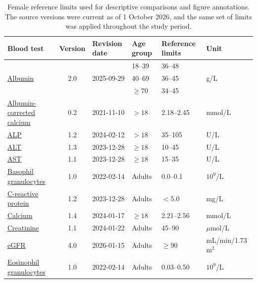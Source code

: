 \begin{table}[H]
\centering
\small
\caption{Female reference limits used for descriptive comparisons and figure annotations. The source versions were current as of 1 October 2026, and the same set of limits was applied throughout the study period.}
\label{tab:laboratory_reference_limits}
\setlength{\tabcolsep}{5pt}
\renewcommand{\arraystretch}{1.1}
\begin{tabular}{@{}lcllll@{}}
\toprule
Blood test & Version & Revision date & Age group & Reference limits & Unit \\
\midrule
\multirow{3}{*}{\href{https://metodebok.no/emne/K88XLHC4}{Albumin}} & \multirow{3}{*}{2.0} & \multirow{3}{*}{2025-09-29} & 18--39 & 36--48 & \multirow{3}{*}{g/L} \\
 &  &  & 40--69 & 36--45 &  \\
 &  &  & $\geq 70$ & 34--45 &  \\
\midrule[0.25pt]
\href{https://metodebok.no/emne/2s8iNNpi}{Albumin-corrected calcium} & 0.2 & 2021-11-10 & $>18$ & 2.18--2.45 & mmol/L \\
\midrule[0.25pt]
\href{https://metodebok.no/emne/bxfRyFeu}{ALP} & 1.2 & 2024-02-12 & $>18$ & 35--105 & U/L \\
\midrule[0.25pt]
\href{https://metodebok.no/emne/kDdUAjT6}{ALT} & 1.3 & 2023-12-28 & $\geq 18$ & 10--45 & U/L \\
\midrule[0.25pt]
\href{https://metodebok.no/emne/EbWvbBiZ}{AST} & 1.1 & 2023-12-28 & $\geq 18$ & 15--35 & U/L \\
\midrule[0.25pt]
\href{https://metodebok.no/emne/qtFMX6KQ}{Basophil granulocytes} & 1.0 & 2022-02-14 & Adults & 0.0--0.1 & $10^9$/L \\
\midrule[0.25pt]
\href{https://metodebok.no/emne/AAAGNvG6}{C-reactive protein} & 1.2 & 2023-12-28 & Adults & $<5.0$ & mg/L \\
\midrule[0.25pt]
\href{https://metodebok.no/emne/2BJXwvsK}{Calcium} & 1.4 & 2024-01-17 & $\geq 18$ & 2.21--2.56 & mmol/L \\
\midrule[0.25pt]
\href{https://metodebok.no/emne/C3K2MXe8}{Creatinine} & 1.1 & 2024-01-22 & Adults & 45--90 & $\mu$mol/L \\
\midrule[0.25pt]
\href{https://metodebok.no/emne/szcrcA8C}{eGFR} & 4.0 & 2026-01-15 & Adults & $\geq 90$ & mL/min/1.73\,m$^2$ \\
\midrule[0.25pt]
\href{https://metodebok.no/emne/qtFMX6KQ}{Eosinophil granulocytes} & 1.0 & 2022-02-14 & Adults & 0.03--0.50 & $10^9$/L \\
\midrule[0.25pt]

\end{tabular}
\end{table}
